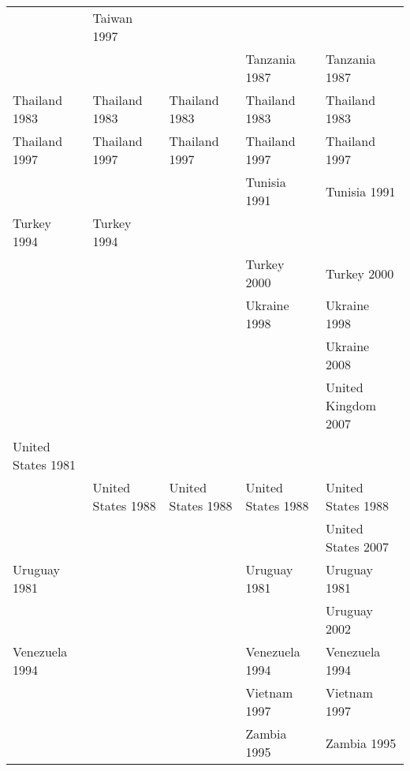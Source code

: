 \begin{table}[ht]
{\begin{tabular}{lllll}
   & Taiwan 1997\cellcolor[gray]{0.75} &  &  &  \\ 
   &  &  & Tanzania 1987\cellcolor[gray]{1} & Tanzania 1987\cellcolor[gray]{1} \\ 
  Thailand 1983\cellcolor[gray]{0.5} & Thailand 1983\cellcolor[gray]{0.5} & Thailand 1983\cellcolor[gray]{0.5} & Thailand 1983\cellcolor[gray]{0.5} & Thailand 1983\cellcolor[gray]{0.5} \\ 
  Thailand 1997\cellcolor[gray]{0.5} & Thailand 1997\cellcolor[gray]{0.5} & Thailand 1997\cellcolor[gray]{0.5} & Thailand 1997\cellcolor[gray]{0.5} & Thailand 1997\cellcolor[gray]{0.5} \\ 
   &  &  & Tunisia 1991\cellcolor[gray]{1} & Tunisia 1991\cellcolor[gray]{1} \\ 
  Turkey 1994\cellcolor[gray]{0.5} & Turkey 1994\cellcolor[gray]{0.5} &  &  &  \\ 
   &  &  & Turkey 2000\cellcolor[gray]{0.5} & Turkey 2000\cellcolor[gray]{0.5} \\ 
   &  &  & Ukraine 1998\cellcolor[gray]{0.5} & Ukraine 1998\cellcolor[gray]{0.5} \\ 
   &  &  &  & Ukraine 2008\cellcolor[gray]{0.5} \\ 
   &  &  &  & United Kingdom 2007\cellcolor[gray]{0.5} \\ 
  United States 1981\cellcolor[gray]{0.5} &  &  &  &  \\ 
   & United States 1988\cellcolor[gray]{0.5} & United States 1988\cellcolor[gray]{0.5} & United States 1988\cellcolor[gray]{0.5} & United States 1988\cellcolor[gray]{0.5} \\ 
   &  &  &  & United States 2007\cellcolor[gray]{0.5} \\ 
  Uruguay 1981\cellcolor[gray]{1} &  &  & Uruguay 1981\cellcolor[gray]{1} & Uruguay 1981\cellcolor[gray]{1} \\ 
   &  &  &  & Uruguay 2002\cellcolor[gray]{0.5} \\ 
  Venezuela 1994\cellcolor[gray]{0.5} &  &  & Venezuela 1994\cellcolor[gray]{0.5} & Venezuela 1994\cellcolor[gray]{0.5} \\ 
   &  &  & Vietnam 1997\cellcolor[gray]{1} & Vietnam 1997\cellcolor[gray]{1} \\ 
   &  &  & Zambia 1995\cellcolor[gray]{0.5} & Zambia 1995\cellcolor[gray]{0.5} \\ 
   \hline
\end{tabular}
}
\end{table}
